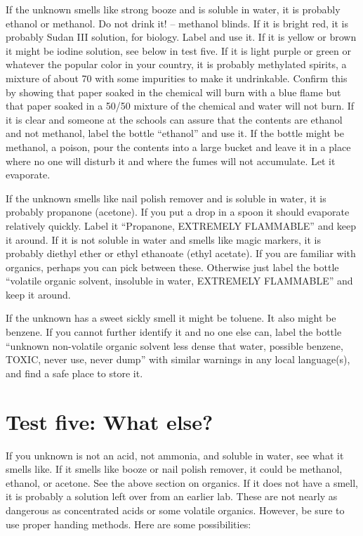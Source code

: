 \begin{itemize}
{If the unknown smells like strong booze and is soluble in water, 
it is probably ethanol or methanol. 
Do not drink it! – methanol blinds. 
If it is bright red, 
it is probably Sudan III solution, 
for biology. 
Label and use it. 
If it is yellow or brown it might be iodine solution, 
see below in test five. 
If it is light purple or green or whatever 
the popular color in your country, 
it is probably methylated spirits, 
a mixture of about 70%
with some impurities to make it undrinkable. 
Confirm this by showing that paper soaked in the chemical 
will burn with a blue flame but that paper soaked in a 50/50 
mixture of the chemical and water will not burn. 
If it is clear and someone at the schools can assure 
that the contents are ethanol and not methanol, 
label the bottle “ethanol” and use it. 
If the bottle might be methanol, 
a poison, 
pour the contents into a large bucket 
and leave it in a place where no one will disturb it 
and where the fumes will not accumulate. 
Let it evaporate.

If the unknown smells like nail polish remover 
and is soluble in water, 
it is probably propanone (acetone). 
If you put a drop in a spoon it should evaporate relatively quickly. 
Label it “Propanone, 
EXTREMELY FLAMMABLE” and keep it around. 
If it is not soluble in water and smells like magic markers, 
it is probably diethyl ether or ethyl ethanoate (ethyl acetate). 
If you are familiar with organics, 
perhaps you can pick between these. 
Otherwise just label the bottle “volatile organic solvent, 
insoluble in water, 
EXTREMELY FLAMMABLE” and keep it around.

If the unknown has a sweet sickly smell it might be toluene. 
It also might be benzene. 
If you cannot further identify it and no one else can, 
label the bottle “unknown non-volatile organic solvent 
less dense that water, 
possible benzene, 
TOXIC, 
never use, 
never dump” with similar warnings in any local language(s), 
and find a safe place to store it.

\section{Test five: What else?}

If you unknown is not an acid, 
not ammonia, 
and soluble in water, 
see what it smells like. 
If it smells like booze or nail polish remover, 
it could be methanol, 
ethanol, 
or acetone. 
See the above section on organics. 
If it does not have a smell, 
it is probably a solution left over from an earlier lab. 
These are not nearly as dangerous as concentrated acids 
or some volatile organics. 
However, 
be sure to use proper handing methods. 
Here are some possibilities:

}
\end{itemize}
